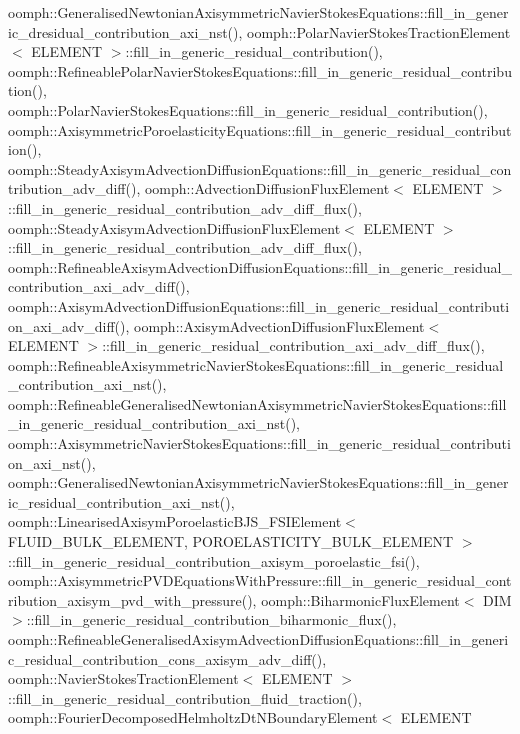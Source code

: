 oomph\+::\+Generalised\+Newtonian\+Axisymmetric\+Navier\+Stokes\+Equations\+::fill\+\_\+in\+\_\+generic\+\_\+dresidual\+\_\+contribution\+\_\+axi\+\_\+nst(), oomph\+::\+Polar\+Navier\+Stokes\+Traction\+Element$<$ E\+L\+E\+M\+E\+N\+T $>$\+::fill\+\_\+in\+\_\+generic\+\_\+residual\+\_\+contribution(), oomph\+::\+Refineable\+Polar\+Navier\+Stokes\+Equations\+::fill\+\_\+in\+\_\+generic\+\_\+residual\+\_\+contribution(), oomph\+::\+Polar\+Navier\+Stokes\+Equations\+::fill\+\_\+in\+\_\+generic\+\_\+residual\+\_\+contribution(), oomph\+::\+Axisymmetric\+Poroelasticity\+Equations\+::fill\+\_\+in\+\_\+generic\+\_\+residual\+\_\+contribution(), oomph\+::\+Steady\+Axisym\+Advection\+Diffusion\+Equations\+::fill\+\_\+in\+\_\+generic\+\_\+residual\+\_\+contribution\+\_\+adv\+\_\+diff(), oomph\+::\+Advection\+Diffusion\+Flux\+Element$<$ E\+L\+E\+M\+E\+N\+T $>$\+::fill\+\_\+in\+\_\+generic\+\_\+residual\+\_\+contribution\+\_\+adv\+\_\+diff\+\_\+flux(), oomph\+::\+Steady\+Axisym\+Advection\+Diffusion\+Flux\+Element$<$ E\+L\+E\+M\+E\+N\+T $>$\+::fill\+\_\+in\+\_\+generic\+\_\+residual\+\_\+contribution\+\_\+adv\+\_\+diff\+\_\+flux(), oomph\+::\+Refineable\+Axisym\+Advection\+Diffusion\+Equations\+::fill\+\_\+in\+\_\+generic\+\_\+residual\+\_\+contribution\+\_\+axi\+\_\+adv\+\_\+diff(), oomph\+::\+Axisym\+Advection\+Diffusion\+Equations\+::fill\+\_\+in\+\_\+generic\+\_\+residual\+\_\+contribution\+\_\+axi\+\_\+adv\+\_\+diff(), oomph\+::\+Axisym\+Advection\+Diffusion\+Flux\+Element$<$ E\+L\+E\+M\+E\+N\+T $>$\+::fill\+\_\+in\+\_\+generic\+\_\+residual\+\_\+contribution\+\_\+axi\+\_\+adv\+\_\+diff\+\_\+flux(), oomph\+::\+Refineable\+Axisymmetric\+Navier\+Stokes\+Equations\+::fill\+\_\+in\+\_\+generic\+\_\+residual\+\_\+contribution\+\_\+axi\+\_\+nst(), oomph\+::\+Refineable\+Generalised\+Newtonian\+Axisymmetric\+Navier\+Stokes\+Equations\+::fill\+\_\+in\+\_\+generic\+\_\+residual\+\_\+contribution\+\_\+axi\+\_\+nst(), oomph\+::\+Axisymmetric\+Navier\+Stokes\+Equations\+::fill\+\_\+in\+\_\+generic\+\_\+residual\+\_\+contribution\+\_\+axi\+\_\+nst(), oomph\+::\+Generalised\+Newtonian\+Axisymmetric\+Navier\+Stokes\+Equations\+::fill\+\_\+in\+\_\+generic\+\_\+residual\+\_\+contribution\+\_\+axi\+\_\+nst(), oomph\+::\+Linearised\+Axisym\+Poroelastic\+B\+J\+S\+\_\+\+F\+S\+I\+Element$<$ F\+L\+U\+I\+D\+\_\+\+B\+U\+L\+K\+\_\+\+E\+L\+E\+M\+E\+N\+T, P\+O\+R\+O\+E\+L\+A\+S\+T\+I\+C\+I\+T\+Y\+\_\+\+B\+U\+L\+K\+\_\+\+E\+L\+E\+M\+E\+N\+T $>$\+::fill\+\_\+in\+\_\+generic\+\_\+residual\+\_\+contribution\+\_\+axisym\+\_\+poroelastic\+\_\+fsi(), oomph\+::\+Axisymmetric\+P\+V\+D\+Equations\+With\+Pressure\+::fill\+\_\+in\+\_\+generic\+\_\+residual\+\_\+contribution\+\_\+axisym\+\_\+pvd\+\_\+with\+\_\+pressure(), oomph\+::\+Biharmonic\+Flux\+Element$<$ D\+I\+M $>$\+::fill\+\_\+in\+\_\+generic\+\_\+residual\+\_\+contribution\+\_\+biharmonic\+\_\+flux(), oomph\+::\+Refineable\+Generalised\+Axisym\+Advection\+Diffusion\+Equations\+::fill\+\_\+in\+\_\+generic\+\_\+residual\+\_\+contribution\+\_\+cons\+\_\+axisym\+\_\+adv\+\_\+diff(), oomph\+::\+Navier\+Stokes\+Traction\+Element$<$ E\+L\+E\+M\+E\+N\+T $>$\+::fill\+\_\+in\+\_\+generic\+\_\+residual\+\_\+contribution\+\_\+fluid\+\_\+traction(), oomph\+::\+Fourier\+Decomposed\+Helmholtz\+Dt\+N\+Boundary\+Element$<$ E\+L\+E\+M\+E\+N\+T 